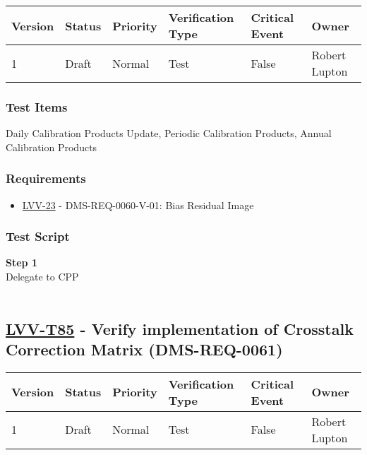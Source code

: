 \begin{longtable}[]{@{}llllll@{}}
\toprule
Version & Status & Priority & Verification Type & Critical Event &
Owner\tabularnewline
\midrule
\endhead
1 & Draft & Normal & Test & False & Robert Lupton\tabularnewline
\bottomrule
\end{longtable}

\hypertarget{test-items-60}{%
\subsubsection{Test Items}\label{test-items-60}}

Daily Calibration Products Update, Periodic Calibration Products, Annual
Calibration Products

\hypertarget{requirements-61}{%
\subsubsection{Requirements}\label{requirements-61}}

\begin{itemize}
\tightlist
\item
  \href{https://jira.lsstcorp.org/browse/LVV-23}{LVV-23} -
  DMS-REQ-0060-V-01: Bias Residual Image
\end{itemize}

\hypertarget{test-script-61}{%
\subsubsection{Test Script}\label{test-script-61}}

\textbf{Step 1}\\
Delegate to CPP\\
~\\

\hypertarget{lvv-t85---verify-implementation-of-crosstalk-correction-matrix-dms-req-0061}{%
\subsection{\texorpdfstring{\href{https://jira.lsstcorp.org/secure/Tests.jspa\#/testCase/LVV-T85}{LVV-T85}
- Verify implementation of Crosstalk Correction Matrix
(DMS-REQ-0061)}{LVV-T85 - Verify implementation of Crosstalk Correction Matrix (DMS-REQ-0061)}}\label{lvv-t85---verify-implementation-of-crosstalk-correction-matrix-dms-req-0061}}

\begin{longtable}[]{@{}llllll@{}}
\toprule
Version & Status & Priority & Verification Type & Critical Event &
Owner\tabularnewline
\midrule
\endhead
1 & Draft & Normal & Test & False & Robert Lupton\tabularnewline
\bottomrule
\end{longtable}


